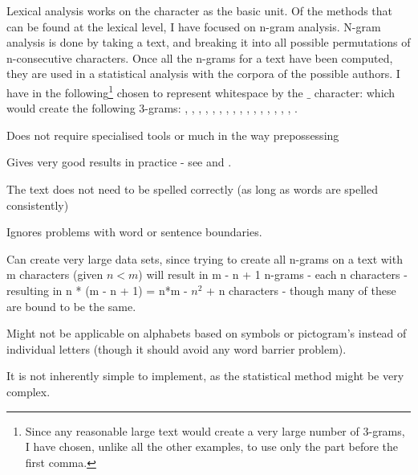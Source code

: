 {\label{character}
Lexical analysis works on the character as the basic unit. Of the methods that can be found at the lexical level, I have focused on n-gram analysis. N-gram analysis is done by taking a text, and breaking it into all possible permutations of n-consecutive characters. Once all the n-grams for a text have been computed, they are used in a statistical analysis with the corpora of the possible authors.
}
{
I have in the following\footnote{Since any reasonable large text would create a very large number of 3-grams, I have chosen, unlike all the other examples, to use only the part before the first comma.} chosen to represent whitespace by the $\_$ character:
which would create the following 3-grams: , , , , , , , , , , , , , , , , . 
}
{
\item Does not require specialised tools or much in the way prepossessing
\item Gives very good results in practice - see \cite{nr4} and \cite{nr3}.
\item The text does not need to be spelled correctly (as long as words are spelled consistently)
\item Ignores problems with word or sentence boundaries.
}
{
\item Can create very large data sets, since trying to create all n-grams on a text with m characters (given $n < m$) will result in m - n + 1 n-grams - each n characters - resulting in n * (m - n + 1) = n*m - $n^2$ + n characters - though many of these are bound to be the same.
\item Might not be applicable on alphabets based on symbols or pictogram's instead of individual letters (though it should avoid any word barrier problem).
\item It is not inherently simple to implement, as the statistical method might be very complex.
}

